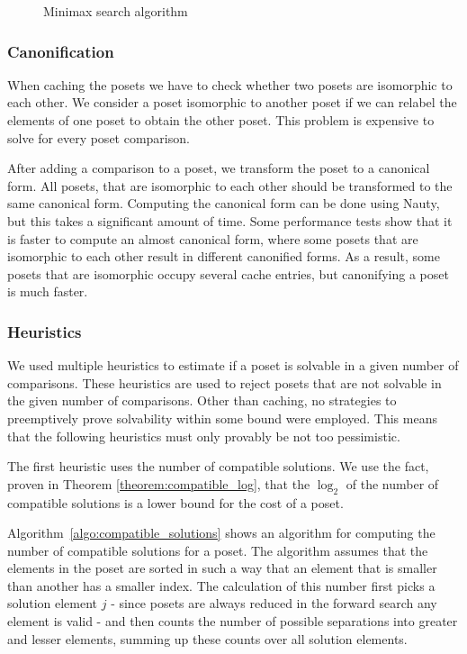 \documentclass[10pt,journal,compsoc]{IEEEtran}
\begin{document}
\begin{figure}[!b]
  \centering
  
  \caption{Minimax search algorithm}
  \label{fig:minimax_search}
\end{figure}

\subsubsection{Canonification}

When caching the posets we have to check whether two posets are isomorphic to each other.
We consider a poset isomorphic to another poset if we can relabel the elements of one poset to obtain the other poset.
This problem is expensive to solve for every poset comparison.

After adding a comparison to a poset, we transform the poset to a canonical form.
All posets, that are isomorphic to each other should be transformed to the same canonical form.
Computing the canonical form can be done using Nauty, but this takes a significant amount of time.
Some performance tests show that it is faster to compute an almost canonical form, where some posets that are isomorphic to each other result in different canonified forms.
As a result, some posets that are isomorphic occupy several cache entries, but canonifying a poset is much faster.

\subsubsection{Heuristics}

We used multiple heuristics to estimate if a poset is solvable in a given number of comparisons.
These heuristics are used to reject posets that are not solvable in the given number of comparisons.
Other than caching, no strategies to preemptively prove solvability within some bound were employed.
This means that the following heuristics must only provably be not too pessimistic.

The first heuristic uses the number of compatible solutions.
We use the fact, proven in Theorem \ref{theorem:compatible_log}, that the $\log_2$ of the number of compatible solutions is a lower bound for the cost of a poset.

Algorithm~\ref{algo:compatible_solutions} shows an algorithm for computing the number of compatible solutions for a poset.
The algorithm assumes that the elements in the poset are sorted in such a way that an element that is smaller than another has a smaller index.
The calculation of this number first picks a solution element $j$ - since posets are always reduced in the forward search any element is valid - and then counts the number of possible separations into greater and lesser elements, summing up these counts over all solution elements.
\end{document}
